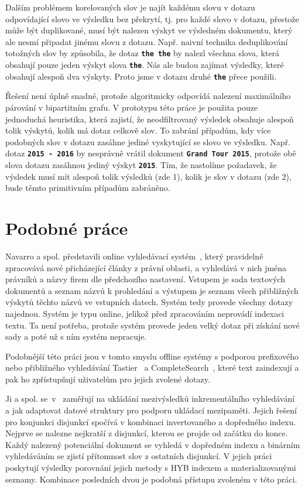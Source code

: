 \documentclass[11pt,letterpaper,oneside,openright]{book}
\newcommand{\bftt}[1]{\texttt{\textbf{#1}}}
\begin{document}
Dalším problémem korelovaných slov je najít každému slovu v dotazu odpovídající
slovo ve výsledku bez překrytí, tj. pro každé slovo v dotazu, přestože může být
duplikované, musí být nalezen výskyt ve výsledném dokumentu, který ale nesmí
připadat jinému slovu z dotazu. Např. naivní technika deduplikování totožných
slov by způsobila, že dotaz \bftt{the the} by nalezl všechna slova, která
obsahují pouze jeden výskyt slova \bftt{the}. Nás ale budou zajímat výsledky,
které obsahují alespoň dva výskyty. Proto jsme v dotazu druhé \bftt{the} přece
použili.

Řešení není úplně snadné, protože algoritmicky odpovídá nalezení maximálního
párování v bipartitním grafu. V prototypu této práce je použita pouze
jednoduchá heuristika, která zajistí, že neodfiltrovaný výsledek obsahuje
alespoň tolik výskytů, kolik má dotaz celkově slov. To zabrání případům, kdy
více podobných slov v dotazu zasáhne jediné vyskytující se slovo ve výsledku.
Např. dotaz \bftt{2015 - 2016} by nesprávně vrátil dokument \bftt{Grand Tour
2015}, protože obě slova dotazu zasáhnou jediný výskyt \bftt{2015}. Tím, že
nastolíme požadavek, že výsledek musí mít alespoň tolik výsledků (zde 1), kolik
je slov v dotazu (zde 2), bude těmto primitivním případům zabráněno.

\section{Podobné práce}
Navarro a spol. představili online vyhledávací
systém~\cite{Navarro:2003:MFA:638683.638685}, který pravidelně zpracovává nové
přicházející články z právní oblasti, a vyhledává v nich jména právníků a názvy
firem dle předchozího nastavení. Vstupem je sada textových dokumentů a seznam
názvů k prohledání a výstupem je seznam všech přibližných výskytů těchto názvů
ve vstupních datech. Systém tedy provede všechny dotazy najednou. Systém je
typu online, jelikož před zpracováním neprovádí indexaci textu. Ta není
potřeba, protože systém provede jeden velký dotaz při získání nové sady a poté
už s ním systém nepracuje.

Podobnější této práci jsou v tomto smyslu offline systémy s podporou
prefixového nebo přibližného vyhledávání
Tastier~\cite{Ji:2009:EIF:1526709.1526760} a
CompleteSearch~\cite{Bast:2006:TLF:1148170.1148234}, které text zaindexují a pak
ho zpřístupňují uživatelům pro jejich zvolené dotazy.

Ji a spol. se~v~\cite{Ji:2009:EIF:1526709.1526760} zaměřují na ukládání
mezivýsledků inkrementálního vyhledávání a jak adaptovat datové struktury pro
podporu ukládací mezipaměti. Jejich řešení pro konjunkci disjunkcí spočívá v
kombinaci invertovaného a dopředného indexu. Nejprve se nalezne nejkratší z
disjunkcí, kterou se projde od začátku do konce. Každý nalezený potenciální
dokument se vyhledá v dopředném indexu a binárním vyhledáváním se zjistí
přítomnost slov z ostatních disjunkcí. V jejich práci poskytují výsledky
porovnání jejich metody s HYB indexem a materializovanými seznamy. Kombinace
posledních dvou je podobná přístupu zvoleném v této práci.
\end{document}

